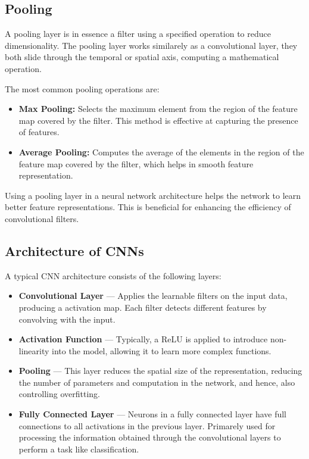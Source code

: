 \subsection{Pooling}
A pooling layer is in essence a filter using a specified operation to reduce dimensionality. The pooling layer works similarely as a convolutional layer, they both slide through the temporal or spatial axis, computing a mathematical operation.

The most common pooling operations are:
\begin{itemize}
    \item \textbf{Max Pooling:} Selects the maximum element from the region of the feature map covered by the filter. This method is effective at capturing the presence of features.
    \item \textbf{Average Pooling:} Computes the average of the elements in the region of the feature map covered by the filter, which helps in smooth feature representation.
\end{itemize}



Using a pooling layer in a neural network architecture helps the network to learn better feature representations. This is beneficial for enhancing the efficiency of convolutional filters.

\subsection{Architecture of CNNs}
A typical CNN architecture consists of the following layers:

\begin{itemize}
    \item \textbf{Convolutional Layer} — Applies the learnable filters on the input data, producing a activation map. Each filter detects different features by convolving with the input.
    \item \textbf{Activation Function} — Typically, a ReLU is applied to introduce non-linearity into the model, allowing it to learn more complex functions.
    \item \textbf{Pooling} — This layer reduces the spatial size of the representation, reducing the number of parameters and computation in the network, and hence, also controlling overfitting. 
    \item \textbf{Fully Connected Layer} — Neurons in a fully connected layer have full connections to all activations in the previous layer. Primarely used for processing the information obtained through the convolutional layers to perform a task like classification.
\end{itemize}


